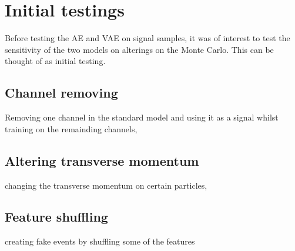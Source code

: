 \section*{Initial testings}
Before testing the AE and VAE on signal samples, it was of interest to test the sensitivity of the
two models on alterings on the Monte Carlo. This can be thought of as initial testing. 
\subsection*{Channel removing}
Removing one channel in the standard model and using it as a signal whilst training on the remainding channels, 
\subsection*{Altering transverse momentum}
changing the transverse momentum on certain particles, 

\subsection*{Feature shuffling}
creating fake events by shuffling some of the features 

\subsection*{}